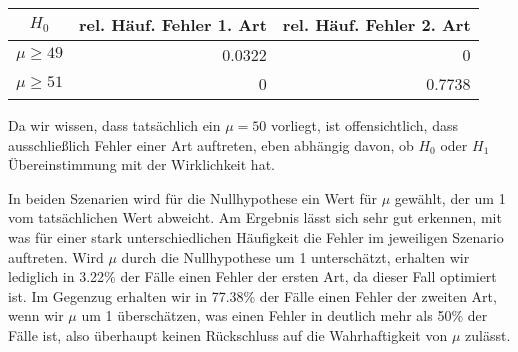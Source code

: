 \documentclass[a4paper]{scrartcl}
\def \blattnr {9}
\begin{document}
\begin{enumerate}[label=\bfseries \blattnr.\arabic*]
      \begin{tabular}{c|r|r}
       $H_0$ & rel. Häuf. Fehler 1. Art & rel. Häuf. Fehler 2. Art \\
       \hline
       $\mu \geq 49$ & 0.0322 & 0 \\
       $\mu \geq 51$ & 0 & 0.7738
      \end{tabular}
      
      Da wir wissen, dass tatsächlich ein $\mu=50$ vorliegt, ist offensichtlich, 
      dass ausschließlich Fehler einer Art auftreten, eben abhängig davon, ob $H_0$ 
      oder $H_1$ Übereinstimmung mit der Wirklichkeit hat.
      
      In beiden Szenarien wird für die Nullhypothese ein Wert für $\mu$ gewählt, der 
      um 1 vom tatsächlichen Wert abweicht. Am Ergebnis lässt sich sehr gut erkennen,
      mit was für einer stark unterschiedlichen Häufigkeit die Fehler im jeweiligen 
      Szenario auftreten. Wird $\mu$ durch die Nullhypothese um 1 unterschätzt, 
      erhalten wir lediglich in 3.22\% der Fälle einen Fehler der ersten Art, 
      da dieser Fall optimiert ist. Im Gegenzug erhalten wir in 77.38\% der Fälle 
      einen Fehler der zweiten Art, wenn wir $\mu$ um 1 überschätzen, was einen 
      Fehler in deutlich mehr als 50\% der Fälle ist, also überhaupt keinen Rückschluss auf 
      die Wahrhaftigkeit von $\mu$ zulässt.

\end{enumerate}
\end{document}
